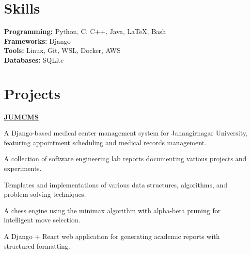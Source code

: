 \documentclass[a4paper,10pt]{article}
\begin{document}
\section*{Skills}

\textbf{Programming:} Python, C, C++, Java, LaTeX, Bash \\
\textbf{Frameworks:} Django \\
\textbf{Tools:} Linux, Git, WSL, Docker, AWS \\
\textbf{Databases:} SQLite


\section*{Projects}
\href{https://github.com/sudiptarathi2020/JUMCMS-Jahangirnagar-University-Medical-Center-Management-System.git}{\textbf{JUMCMS}}
\begin{boxB}
    A Django-based medical center management system for Jahangirnagar University, featuring appointment scheduling and medical records management.
\end{boxB}



\begin{projectbox}[title={\href{https://github.com/sudiptarathi2020/Software-Engineering-Lab-CSE404-Reports.git}{Software Engineering Lab Reports}}]
A collection of software engineering lab reports documenting various projects and experiments.
\end{projectbox}

\begin{projectbox}[title={\href{https://github.com/sudiptarathi2020/Data-structures-and-Algorithms.git}{Data Structures \& Algorithms}}]
Templates and implementations of various data structures, algorithms, and problem-solving techniques.
\end{projectbox}

\begin{projectbox}[title={\href{https://github.com/sudiptarathi2020/Simple-Chess-Engine.git}{Chess Engine}}]
A chess engine using the minimax algorithm with alpha-beta pruning for intelligent move selection.
\end{projectbox}

\begin{projectbox}[title={\href{https://github.com/sudiptarathi2020/academic-report-maker.git}{Academic Report Maker}}]
A Django + React web application for generating academic reports with structured formatting.
\end{projectbox}
\end{document}
